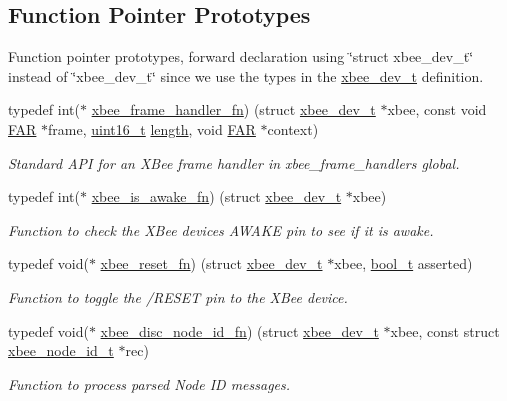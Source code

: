 \subsection*{Function Pointer Prototypes}
\label{_amgrp2f5754cb0cad19832264f831971ef24c}%
Function pointer prototypes, forward declaration using \char`\"{}struct xbee\+\_\+dev\+\_\+t\char`\"{} instead of \char`\"{}xbee\+\_\+dev\+\_\+t\char`\"{} since we use the types in the \hyperlink{structxbee__dev__t}{xbee\+\_\+dev\+\_\+t} definition. \begin{DoxyCompactItemize}
\item 
typedef int($\ast$ \hyperlink{group__xbee__device_ga3e6f2b540e8cec7a69ef0b0166da14ff}{xbee\+\_\+frame\+\_\+handler\+\_\+fn}) (struct \hyperlink{structxbee__dev__t}{xbee\+\_\+dev\+\_\+t} $\ast$xbee, const void \hyperlink{group__hal_gaef060b3456fdcc093a7210a762d5f2ed}{F\+AR} $\ast$frame, \hyperlink{group__hal__dos_ga5a8b2dc9e45a9ee81a94ef304fb62505}{uint16\+\_\+t} \hyperlink{group__zdo_gab2b3adeb2a67e656ff030b56727fd0ac}{length}, void \hyperlink{group__hal_gaef060b3456fdcc093a7210a762d5f2ed}{F\+AR} $\ast$context)
\begin{DoxyCompactList}\small\item\em Standard A\+PI for an X\+Bee frame handler in xbee\+\_\+frame\+\_\+handlers global. \end{DoxyCompactList}\item 
typedef int($\ast$ \hyperlink{group__xbee__device_ga47d67ee70583d9a2a0cf7ae1eb672af8}{xbee\+\_\+is\+\_\+awake\+\_\+fn}) (struct \hyperlink{structxbee__dev__t}{xbee\+\_\+dev\+\_\+t} $\ast$xbee)
\begin{DoxyCompactList}\small\item\em Function to check the X\+Bee device\textquotesingle{}s A\+W\+A\+KE pin to see if it is awake. \end{DoxyCompactList}\item 
typedef void($\ast$ \hyperlink{group__xbee__device_gaa6b2701f8516c2947424178c4bacab83}{xbee\+\_\+reset\+\_\+fn}) (struct \hyperlink{structxbee__dev__t}{xbee\+\_\+dev\+\_\+t} $\ast$xbee, \hyperlink{group__hal__dos_ga04dd5074964518403bf944f2b240a5f8}{bool\+\_\+t} asserted)
\begin{DoxyCompactList}\small\item\em Function to toggle the /\+R\+E\+S\+ET pin to the X\+Bee device. \end{DoxyCompactList}\item 
typedef void($\ast$ \hyperlink{group__xbee__device_ga64bf72cf58030a080f12f8916cd7d2a2}{xbee\+\_\+disc\+\_\+node\+\_\+id\+\_\+fn}) (struct \hyperlink{structxbee__dev__t}{xbee\+\_\+dev\+\_\+t} $\ast$xbee, const struct \hyperlink{structxbee__node__id__t}{xbee\+\_\+node\+\_\+id\+\_\+t} $\ast$rec)
\begin{DoxyCompactList}\small\item\em Function to process parsed Node ID messages. \end{DoxyCompactList}\end{DoxyCompactItemize}
